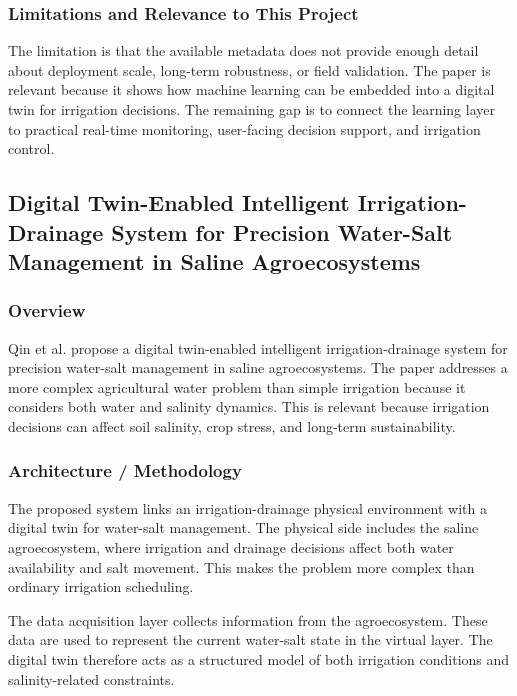 \subsubsection{Limitations and Relevance to This Project}

The limitation is that the available metadata does not provide enough detail about deployment scale, long-term robustness, or field validation. The paper is relevant because it shows how machine learning can be embedded into a digital twin for irrigation decisions. The remaining gap is to connect the learning layer to practical real-time monitoring, user-facing decision support, and irrigation control.

\subsection[Digital Twin-Enabled Intelligent Irrigation-Drainage System for Precision Water-Salt Management in Saline Agroecosystems]{Digital Twin-Enabled Intelligent Irrigation-Drainage System for Precision Water-Salt Management in Saline Agroecosystems \cite{qin2025irrigationdrainagedt}}

\subsubsection{Overview}

Qin et al. propose a digital twin-enabled intelligent irrigation-drainage system for precision water-salt management in saline agroecosystems. The paper addresses a more complex agricultural water problem than simple irrigation because it considers both water and salinity dynamics. This is relevant because irrigation decisions can affect soil salinity, crop stress, and long-term sustainability.

\subsubsection{Architecture / Methodology}

The proposed system links an irrigation-drainage physical environment with a digital twin for water-salt management. The physical side includes the saline agroecosystem, where irrigation and drainage decisions affect both water availability and salt movement. This makes the problem more complex than ordinary irrigation scheduling.

The data acquisition layer collects information from the agroecosystem. These data are used to represent the current water-salt state in the virtual layer. The digital twin therefore acts as a structured model of both irrigation conditions and salinity-related constraints.

